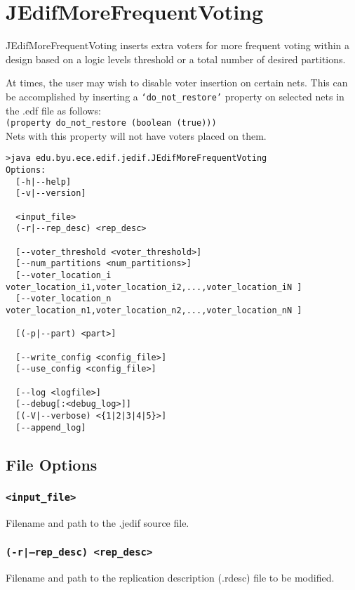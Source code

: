 \section{JEdifMoreFrequentVoting}
JEdifMoreFrequentVoting inserts extra voters for more frequent voting within
a design based on a logic levels threshold or a total number of desired
partitions.

At times, the user may wish to disable voter insertion on certain nets. This
can be accomplished by inserting a \texttt{`do\_not\_restore'} property on
selected nets in the .edf file as follows:\\
\texttt{(property do\_not\_restore (boolean (true)))}\\

Nets with this property will not have voters placed on them.

\begin{verbatim}
>java edu.byu.ece.edif.jedif.JEdifMoreFrequentVoting
Options:
  [-h|--help]
  [-v|--version]

  <input_file>
  (-r|--rep_desc) <rep_desc>

  [--voter_threshold <voter_threshold>]
  [--num_partitions <num_partitions>]
  [--voter_location_i voter_location_i1,voter_location_i2,...,voter_location_iN ]
  [--voter_location_n voter_location_n1,voter_location_n2,...,voter_location_nN ]

  [(-p|--part) <part>]

  [--write_config <config_file>]
  [--use_config <config_file>]

  [--log <logfile>]
  [--debug[:<debug_log>]]
  [(-V|--verbose) <{1|2|3|4|5}>]
  [--append_log]

\end{verbatim}

\subsection{File Options}

\subsubsection{\texttt{<input\_file>}}
Filename and path to the .jedif source file.

\subsubsection{\texttt{(-r|--rep\_desc) <rep\_desc>}}
Filename and path to the replication description (.rdesc) file to be modified.

